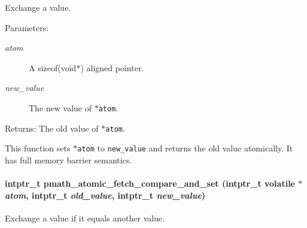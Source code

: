 Exchange a value. 

\begin{Desc}
\item[Parameters:]
\begin{description}
\item[{\em atom}]A sizeof(void$\ast$) aligned pointer. \item[{\em new\_\-value}]The new value of {\tt $\ast$atom}. \end{description}
\end{Desc}
\begin{Desc}
\item[Returns:]The old value of {\tt $\ast$atom}.\end{Desc}
This function sets {\tt $\ast$atom} to {\tt new\_\-value} and returns the old value atomically. It has full memory barrier semantics. \hypertarget{group__atomic__ops_g0eb65b0a5caacf019bf1c97616f69603}{
\paragraph[{pmath\_\-atomic\_\-fetch\_\-compare\_\-and\_\-set}]{\setlength{\rightskip}{0pt plus 5cm}intptr\_\-t pmath\_\-atomic\_\-fetch\_\-compare\_\-and\_\-set (intptr\_\-t volatile $\ast$ {\em atom}, \/  intptr\_\-t {\em old\_\-value}, \/  intptr\_\-t {\em new\_\-value})}\hfill}
\label{group__atomic__ops_g0eb65b0a5caacf019bf1c97616f69603}


Exchange a value if it equals another value. 

